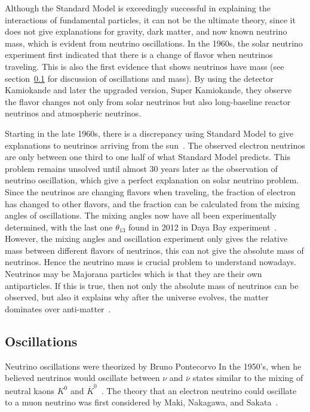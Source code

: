\documentclass[aps,prd,twocolumn,nofootinbib]{revtex4-1}
\begin{document}
Although the Standard Model is exceedingly successful in explaining the interactions of fundamental particles, it can not be the ultimate theory, since it does not give explanations for gravity, dark matter, and now known neutrino mass, which is evident from neutrino oscillations. In the 1960s, the solar neutrino experiment first indicated that there is a change of flavor when neutrinos traveling. This is also the first evidence that shows neutrinos have mass (see section~\ref{sec:oscillate} for discussion of oscillations and mass). By using the detector Kamiokande and later the upgraded version, Super Kamiokande, they observe the flavor changes not only from solar neutrinos but also long-baseline reactor neutrinos and atmospheric neutrinos.

Starting in the late 1960s, there is a discrepancy using Standard Model to give explanations to neutrinos arriving from the sun~\cite{ping2}. The observed electron neutrinos are only between one third to one half of what Standard Model predicts. This problem remains unsolved until almost 30 years later as the observation of neutrino oscillation, which give a perfect explanation on solar neutrino problem. Since the neutrinos are changing flavors when traveling, the fraction of electron has changed to other flavors, and the fraction can be calculated from the mixing angles of oscillations. The mixing angles now have all been experimentally determined, with the last one $\theta_{13}$ found in 2012 in Daya Bay experiment~\cite{ping3}. However, the mixing angles and oscillation experiment only gives the relative mass between different flavors of neutrinos, this can not give the absolute mass of neutrinos. Hence the neutrino mass is crucial problem to understand nowadays. Neutrinos may be Majorana particles which is that they are their own antiparticles. If this is true, then not only the absolute mass of neutrinos can be observed, but also it explains why after the universe evolves, the matter dominates over anti-matter~\cite{ping4}.

\subsection{Oscillations}
\label{sec:oscillate}
Neutrino oscillations were theorized by Bruno Pontecorvo In the 1950's, when he believed neutrinos would oscillate between $\nu$ and $\overline{\nu}$ states similar to the mixing of neutral kaons $K^0$ and $\overline{K}^0$~\cite{ponte}. The theory that an electron neutrino could oscillate to a muon neutrino was first considered by Maki, Nakagawa, and Sakata~\cite{MNS}.
\end{document}
